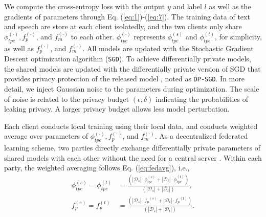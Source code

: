 \documentclass[11pt]{article}
\begin{document}
{
We compute the cross-entropy loss with the output $y$ and label $l$ as well as the gradients of parameters through Eq. (\ref{eq:1})-(\ref{eq:7}). The training data of text and speech are store at each client isolatedly, and the two clients only share ${\phi}_{tpe}^{(\cdot)}, {f}_{p}^{(\cdot)}$,  and ${f}_m^{(\cdot)}$ to each other. ${\phi}_{tpe}^{(\cdot)}$ represents ${\phi}_{tpe}^{(s)}$ and ${\phi}_{tpe}^{(t)}$, for simplicity, as well as ${f}_{p}^{(\cdot)}$, and ${f}_m^{(\cdot)}$.  All models are updated with  the Stochastic Gradient Descent optimization algorithm (\texttt{SGD}). To achieve differentially private models, the shared models are updated with the differentially private version of SGD that provides privacy protection of the released model \cite{abadi2016deep}, noted as \texttt{DP-SGD}. In more detail, we inject Gaussian noise \cite{dwork2014algorithmic} to the parameters during optimization. The scale of noise is related to the privacy budget $(\epsilon, \delta)$ indicating the probabilities of leaking privacy. A larger privacy budget allows less model perturbation.


Each client conducts local training using their local data, and conducts weighted average over parameters of ${\phi}_{tpe}^{(\cdot)}, {f}_{p}^{(\cdot)}$,  and ${f}_m^{(\cdot)}$. As a  decentralized federated learning scheme, two parties directly exchange differentially private parameters of shared models with each other without the need for a central server \cite{yang2020federated}. Within each party, the weighted averaging follows Eq. (\ref{eq:fedavg}), i.e.,
\begin{equation}
\begin{aligned}
    {\phi}_{tpe}^{(s)}={\phi}_{tpe}^{(t)} &= \frac{\left(|\mathcal{D}_s|\cdot{\phi}_{tpe}^{(s)}+|\mathcal{D}_t|\cdot{\phi}_{tpe}^{(t)}\right)}{\left(|\mathcal{D}_s|+|\mathcal{D}_t|\right)},\\
    {f}_{p}^{(s)}={f}_{p}^{(t)} &= \frac{\left(|\mathcal{D}_s|\cdot{f_p}^{(s)}+|\mathcal{D}_t|\cdot{f_p}^{(t)}\right)}{\left(|\mathcal{D}_s|+|\mathcal{D}_t|\right)}.
    \label{eq:fedavg}
\end{aligned}
\end{equation}
}
\end{document}
